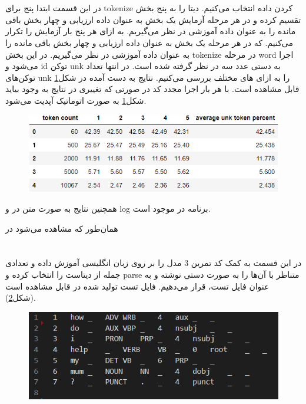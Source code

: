 \documentclass[10pt]{article}
\begin{document}
\section{
}

در این قسمت ابتدا پنج 
برای tokenize کردن داده انتخاب می‌کنیم. دیتا را به پنج بخش تقسیم کرده و در هر مرحله آزمایش یک بخش به عنوان داده ارزیابی و چهار بخش باقی مانده را به عنوان داده آموزشی در نظر می‌گیریم. به ازای هر
پنج بار آزمایش را تکرار می‌کنیم. که در هر مرحله یک بخش به عنوان داده ارزیابی و چهار بخش باقی مانده را به عنوان داده آموزشی در نظر می‌گیریم. در این بخش tokenize در مرحله word اجرا می‌شود و  id توکن unk به دستی عدد سه در نظر گرفته شده است. در انتها تعداد توکن‌های unk را به ازای
های مختلف بررسی می‌کنیم. نتایج به دست آمده در شکل\ref{tok} قابل مشاهده است. با هر بار اجرا مجدد کد در صورتی که تغییری در نتایج به وجود بیاید شکل\ref{tok} به صورت اتوماتیک آپدیت می‌شود.
\begin{figure}[ht!]
	\centering\includegraphics[width=\linewidth]{../reports/tokenization.png}
	\caption{
		}
	\label{tok}
\end{figure}

همچنین نتایج به صورت متن در
و log برنامه در 
موجود است.

همان‌طور که مشاهده می‌شود در
\newpage

\section{
}

در این قسمت به کمک کد تمرین 3 مدل
را بر روی زبان انگلیسی آموزش داده و تعدادی جمله از دیتاست را انتخاب کرده و parse متناظر با آن‌ها را به صورت دستی نوشته و به عنوان فایل تست، قرار می‌دهیم. فایل تست تولید شده در 
قابل مشاهده است (شکل\ref{dep_parser_test}).
\begin{figure}[ht!]
	\centering\includegraphics[width=\linewidth]{../reports/dep_parser_test.png}
	\caption{
		}
	\label{dep_parser_test}
\end{figure}
\end{document}
